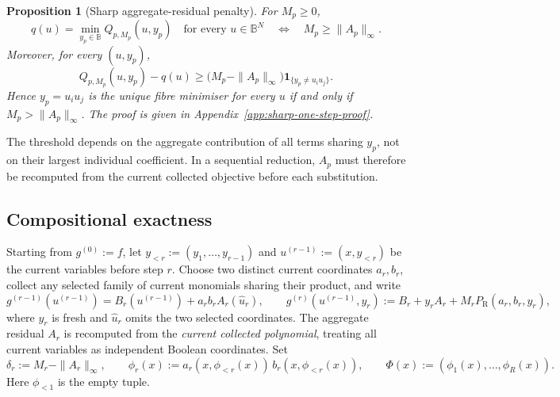 \documentclass[a4paper,onecolumn,11pt,unpublished]{quantumarticle}
\newtheorem{proposition}[proposition]{Proposition}
\theoremstyle{remark}
\begin{document}
\begin{proposition}[Sharp aggregate-residual penalty]
\label{prop:sharp-aggregate-residual}
For \(M_p\geq0\),
\begin{equation}
  q(u)=\min_{y_p\in\mathbb{B}}Q_{p,M_p}(u,y_p)
  \quad\text{for every }u\in\mathbb{B}^N
  \quad\Longleftrightarrow\quad
  M_p\geq\|A_p\|_\infty.
  \label{eq:sharp-one-step-threshold}
\end{equation}
Moreover, for every \((u,y_p)\),
\begin{equation}
  Q_{p,M_p}(u,y_p)-q(u)
  \geq
  \bigl(M_p-\|A_p\|_\infty\bigr)
  \mathbf{1}_{\{y_p\neq u_i u_j\}}.
  \label{eq:one-step-margin}
\end{equation}
Hence \(y_p=u_i u_j\) is the unique fibre minimiser for every \(u\) if and
only if \(M_p>\|A_p\|_\infty\).  The proof is given in
Appendix~\ref{app:sharp-one-step-proof}.
\end{proposition}

The threshold depends on the aggregate contribution of all terms sharing
\(y_p\), not on their largest individual coefficient.  In a sequential
reduction, \(A_p\) must therefore be recomputed from the current collected
objective before each substitution.
\subsection{Compositional exactness}
\label{sec:compositional-exactness}

Starting from \(g^{(0)}:=f\), let
\(y_{<r}:=(y_1,\ldots,y_{r-1})\) and
\(u^{(r-1)}:=(x,y_{<r})\) be the current variables before step \(r\).
Choose two distinct current coordinates \(a_r,b_r\), collect any selected
family of current monomials sharing their product, and write
\begin{equation}
  g^{(r-1)}(u^{(r-1)})
  =B_r(u^{(r-1)})+a_rb_rA_r(\widehat u_r),
  \qquad
  g^{(r)}(u^{(r-1)},y_r)
  :=B_r+y_rA_r+M_rP_{\mathrm R}(a_r,b_r,y_r),
  \label{eq:sequential-substitution}
\end{equation}
where \(y_r\) is fresh and \(\widehat u_r\) omits the two selected
coordinates.  The aggregate residual \(A_r\) is recomputed from the
\emph{current collected polynomial}, treating all current variables as
independent Boolean coordinates.  Set
\begin{equation}
  \delta_r:=M_r-\|A_r\|_\infty,
  \qquad
  \phi_r(x):=a_r(x,\phi_{<r}(x))\,b_r(x,\phi_{<r}(x)),
  \qquad
  \Phi(x):=(\phi_1(x),\ldots,\phi_R(x)).
  \label{eq:sequential-margin-and-lift}
\end{equation}
Here \(\phi_{<1}\) is the empty tuple.
\end{document}
